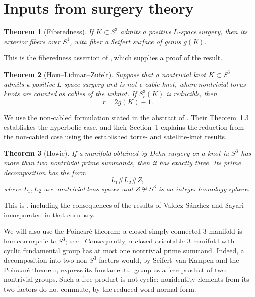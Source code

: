\documentclass[11pt]{article}
\newcommand{\surg}[2]{S^3_{#1}(#2)}
\newtheorem{theorem}{Theorem}
\begin{document}
\section{Inputs from surgery theory}

\begin{theorem}[Fiberedness]\label{thm:fibered}
If \(K\subset S^3\) admits a positive \(L\)-space surgery, then its
exterior fibers over \(S^1\), with fiber a Seifert surface of genus
\(g(K)\).
\end{theorem}

This is the fiberedness assertion of
\cite[Theorem~1]{BaldwinSivek}, which supplies a proof of the result.

\begin{theorem}[Hom--Lidman--Zufelt]\label{thm:slope}
Suppose that a nontrivial knot \(K\subset S^3\) admits a positive
\(L\)-space surgery and is not a cable knot, where nontrivial torus
knots are counted as cables of the unknot. If \(\surg{r}{K}\) is
reducible, then
\[
    r=2g(K)-1.
\]
\end{theorem}

We use the non-cabled formulation stated in the abstract of
\cite{HLZ}. Their Theorem~1.3 establishes the hyperbolic case, and
their Section~1 explains the reduction from the non-cabled case using
the established torus- and satellite-knot results.

\begin{theorem}[Howie]\label{thm:three}
If a manifold obtained by Dehn surgery on a knot in \(S^3\) has more
than two nontrivial prime summands, then it has exactly three.
Its prime decomposition has the form
\[
    L_1\#L_2\# Z,
\]
where \(L_1,L_2\) are nontrivial lens spaces and \(Z\not\cong S^3\) is
an integer homology sphere.
\end{theorem}

This is \cite[Corollary~5.3]{Howie}, including the consequences of the
results of Valdez-S\'anchez and Sayari incorporated in that corollary.

We will also use the Poincar\'e theorem: a closed simply connected
\(3\)-manifold is homeomorphic to \(S^3\); see \cite{MorganTian}.
Consequently, a closed orientable \(3\)-manifold with cyclic
fundamental group has at most one nontrivial prime summand.
Indeed, a decomposition into two non-\(S^3\) factors would, by
Seifert--van Kampen and the Poincar\'e theorem, express its fundamental
group as a free product of two nontrivial groups. Such a free product
is not cyclic: nonidentity elements from its two factors do not
commute, by the reduced-word normal form.
\end{document}
